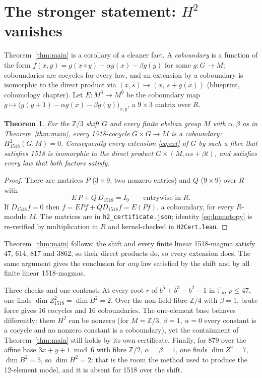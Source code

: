 \documentclass[11pt]{article}
\newtheorem{theorem}{Theorem}
\theoremstyle{remark}\newtheorem*{remark}{Remark}
\newcommand{\op}{\diamond}
\newcommand{\Z}{\mathbb{Z}}
\newcommand{\F}{\mathbb{F}}
\begin{document}
\section{The stronger statement: $H^{2}$ vanishes}\label{sec:h2}

Theorem~\ref{thm:main} is a corollary of a cleaner fact. A \emph{coboundary} is a function of the form $f(x,y)=g(x\op y)-\alpha g(x)-\beta g(y)$ for some $g\colon G\to M$; coboundaries are cocycles for every law, and an extension by a coboundary is isomorphic to the direct product via $(x,s)\mapsto(x,\,s+g(x))$ (blueprint, cohomology chapter). Let $E\colon M^{3}\to M^{9}$ be the coboundary map $g\mapsto\bigl(g(y+1)-\alpha g(x)-\beta g(y)\bigr)_{x,y}$, a $9\times 3$ matrix over $R$.

\begin{theorem}\label{thm:h2}
For the $\Z/3$ shift $G$ and every finite abelian group $M$ with $\alpha,\beta$ as in Theorem~\ref{thm:main}, every 1518-cocycle $G\times G\to M$ is a coboundary: $H^{2}_{1518}(G,M)=0$. Consequently every extension \eqref{eq:ext} of $G$ by such a fibre that satisfies 1518 is isomorphic to the direct product $G\times(M,\alpha s+\beta t)$, and satisfies every law that both factors satisfy.
\end{theorem}

\begin{proof}
There are matrices $P$ ($3\times 9$, two nonzero entries) and $Q$ ($9\times 9$) over $R$ with
\begin{equation}\label{eq:homotopy}
E\,P+Q\,D_{1518}=I_{9}\qquad\text{entrywise in }R .
\end{equation}
If $D_{1518}f=0$ then $f=EPf+QD_{1518}f=E(Pf)$, a coboundary, for every $R$-module $M$. The matrices are in \texttt{h2\_certificate.json}; identity \eqref{eq:homotopy} is re-verified by multiplication in $R$ and kernel-checked in \texttt{H2Cert.lean}.
\end{proof}

Theorem~\ref{thm:main} follows: the shift and every finite linear 1518-magma satisfy 47, 614, 817 and 3862, so their direct products do, so every extension does. The same argument gives the conclusion for \emph{any} law satisfied by the shift and by all finite linear 1518-magmas.

Three checks and one contrast. At every root $r$ of $b^{5}+b^{3}-b^{2}-1$ in $\F_p$, $p\le47$, one finds $\dim Z^{2}_{1518}=\dim B^{2}=2$. Over the non-field fibre $\Z/4$ with $\beta=1$, brute force gives 16 cocycles and 16 coboundaries. The one-element base behaves differently: there $H^{2}$ can be nonzero (for $M=\Z/3$, $\beta=1$, $\alpha=0$ every constant is a cocycle and no nonzero constant is a coboundary), yet the containment of Theorem~\ref{thm:main} still holds by its own certificate. Finally, for $879$ over the affine base $3x+y+1 \bmod 6$ with fibre $\Z/2$, $\alpha=\beta=1$, one finds $\dim Z^{2}=7$, $\dim B^{2}=5$, so $\dim H^{2}=2$: that is the room the method used to produce the 12-element model, and it is absent for 1518 over the shift.
\end{document}
